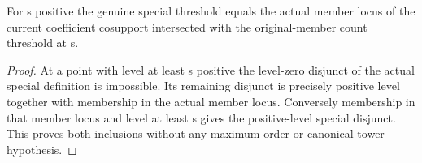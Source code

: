 \begin{lemma}
\label{hir:member-companion-positive-exact-dictionary}
\leanok
For s positive the genuine special threshold equals the actual member locus
of the current coefficient cosupport intersected with the original-member
count threshold at s.
\end{lemma}
\begin{proof}
At a point with level at least s positive the level-zero disjunct of the
actual special definition is impossible. Its remaining disjunct is precisely
positive level together with membership in the actual member locus. Conversely
membership in that member locus and level at least s gives the positive-level
special disjunct. This proves both inclusions without any maximum-order or
canonical-tower hypothesis.
\end{proof}

